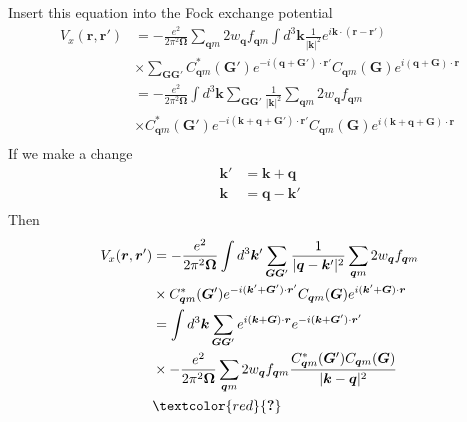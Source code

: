\documentclass[a4paper,12pt]{article}
\begin{document}
Insert this equation into the Fock exchange potential
\begin{equation}
    \begin{split}
        V_{x}(\boldsymbol{r},\boldsymbol{r}')&=-\frac{e^2}{2\pi^2\boldsymbol{\Omega}}
        \sum_{\boldsymbol{q}m}2w_{\boldsymbol{q}}f_{\boldsymbol{q}m}
        \int d^3\boldsymbol{k}
        \frac{1}{{|\boldsymbol{k}|^2}}e^{i\boldsymbol{k}\cdot(\boldsymbol{r}-\boldsymbol{r}')}\\
        &\times \sum_{\boldsymbol{G}\boldsymbol{G}'} C_{\boldsymbol{q}m}^{*}(\boldsymbol{G}')e^{-i(\boldsymbol{q}+\boldsymbol{G}')\cdot \boldsymbol{r}'}
        C_{\boldsymbol{q}m}(\boldsymbol{G})e^{i(\boldsymbol{q}+\boldsymbol{G})\cdot \boldsymbol{r}}\\
        &=-\frac{e^2}{2\pi^2\boldsymbol{\Omega}}
        \int d^3\boldsymbol{k}\sum_{\boldsymbol{G}\boldsymbol{G}'} 
        \frac{1}{{|\boldsymbol{k}|^2}}\sum_{\boldsymbol{q}m}2w_{\boldsymbol{q}}f_{\boldsymbol{q}m}\\
        &\times C_{\boldsymbol{q}m}^{*}(\boldsymbol{G}')e^{-i(\boldsymbol{k}+\boldsymbol{q}+\boldsymbol{G}')\cdot \boldsymbol{r}'}
        C_{\boldsymbol{q}m}(\boldsymbol{G})e^{i(\boldsymbol{k}+\boldsymbol{q}+\boldsymbol{G})\cdot \boldsymbol{r}}\\
    \end{split}
\end{equation}
If we make a change
\begin{equation}
    \begin{split}
        \boldsymbol{k}'&=\boldsymbol{k}+\boldsymbol{q}\\
        \boldsymbol{k}&=\boldsymbol{q}-\boldsymbol{k}'\\
    \end{split}
\end{equation}
Then
\begin{equation}
    \begin{split}
        V_{x}(\boldsymbol{r},\boldsymbol{r}')&=-\frac{e^2}{2\pi^2\boldsymbol{\Omega}}
        \int d^3\boldsymbol{k}'\sum_{\boldsymbol{G}\boldsymbol{G}'} 
        \frac{1}{{|\boldsymbol{q}-\boldsymbol{k}'|^2}}\sum_{\boldsymbol{q}m}2w_{\boldsymbol{q}}f_{\boldsymbol{q}m}\\
        &\times C_{\boldsymbol{q}m}^{*}(\boldsymbol{G}')e^{-i(\boldsymbol{k}'+\boldsymbol{G}')\cdot \boldsymbol{r}'}
        C_{\boldsymbol{q}m}(\boldsymbol{G})e^{i(\boldsymbol{k}'+\boldsymbol{G})\cdot \boldsymbol{r}}\\
        &=\int d^3\boldsymbol{k}\sum_{\boldsymbol{G}\boldsymbol{G}'}
        e^{i(\boldsymbol{k}+\boldsymbol{G})\cdot \boldsymbol{r}}e^{-i(\boldsymbol{k}+\boldsymbol{G}')\cdot \boldsymbol{r}'}\\
        &\times-\frac{e^2}{2\pi^2\boldsymbol{\Omega}}\sum_{\boldsymbol{q}m}2w_{\boldsymbol{q}}f_{\boldsymbol{q}m}
         \frac{C_{\boldsymbol{q}m}^{*}(\boldsymbol{G}')
        C_{\boldsymbol{q}m}(\boldsymbol{G})}{|\boldsymbol{k}-\boldsymbol{q}|^2}\\
        &\textcolor{red}{\textbf{?}}\\
    \end{split}
\end{equation}
\end{document}
